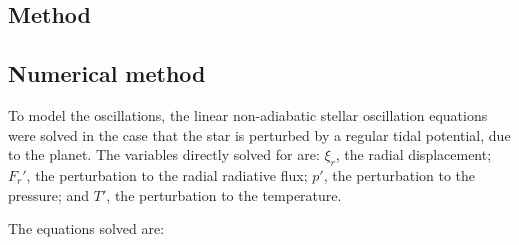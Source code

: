\documentclass[a0,portrait]{a0poster}
\begin{document}
\begin{multicols}{2}
\begin{tcolorbox}[colframe=black,colback=blue!10!white]
\section*{Method}


\subsection*{Numerical method}

To model the oscillations, the linear non-adiabatic stellar oscillation equations were solved in the case that the star is perturbed by a regular tidal potential, due to the planet. The variables directly solved for are: $\xi_{r}$, the radial displacement; $F_{r}'$, the perturbation to the radial radiative flux; $p'$, the perturbation to the pressure; and $T'$, the perturbation to the temperature.

The equations solved are:


\end{tcolorbox}
\end{multicols}
\end{document}
